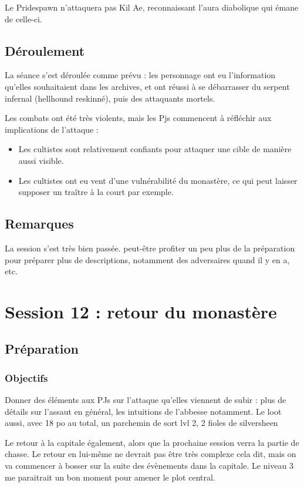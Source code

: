 \documentclass[10pt,a4paper]{book}
\begin{document}
Le Pridespawn n'attaquera pas Kil Ae, reconnaissant l'aura diabolique qui émane de celle-ci.
\subsection{Déroulement}
La séance s'est déroulée comme prévu : les personnage ont eu l'information qu'elles souhaitaient dans les archives, et ont réussi à se débarrasser du serpent infernal (hellhound reskinné), puis des attaquants mortels.

Les combats ont été très violents, mais les Pjs commencent à réfléchir aux implications de l'attaque : 
\begin{itemize}
\item Les cultistes sont relativement confiants pour attaquer une cible de manière aussi visible.
\item Les cultistes ont eu vent d'une vulnérabilité du monastère, ce qui peut laisser supposer un traître à la court par exemple.
\end{itemize}
\subsection{Remarques}
La session s'est très bien passée. peut-être profiter un peu plus de la préparation pour préparer plus de descriptions, notamment des adversaires quand il y en a, etc.
\section{Session 12 : retour du monastère}
\subsection{Préparation}
\subsubsection{Objectifs}
Donner des éléments aux PJs sur l'attaque qu'elles viennent de subir : plus de détails sur l'assaut en général, les intuitions de l'abbesse notamment. Le loot aussi, avec 18 po au total, un parchemin de sort lvl 2, 2 fioles de silversheen

Le retour à la capitale également, alors que la prochaine session verra la partie de chasse. Le retour en lui-même ne devrait pas être très complexe cela dit, mais on va commencer à bosser sur la suite des évènements dans la capitale. Le niveau 3 me paraitrait un bon moment pour amener le plot central.
\end{document}
